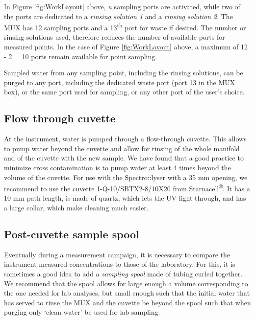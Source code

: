\documentclass[]{book}
\begin{document}
In Figure \ref{fig:WorkLayout} above, \emph{n} sampling ports are activated, while two of the ports are dedicated to a \emph{rinsing solution 1} and a \emph{rinsing solution 2}. The MUX has 12 sampling ports and a 13\textsuperscript{th} port for waste if desired. The number or rinsing solutions used, therefore reduces the number of available ports for measured points. In the case of Figure \ref{fig:WorkLayout} above, a maximum of 12 - 2 = 10 ports remain available for point sampling.

Sampled water from any sampling point, including the rinsing solutions, can be purged to any port, including the dedicated waste port (port 13 in the MUX box), or the same port used for sampling, or any other port of the user's choice.

\hypertarget{flow-through-cuvette}{%
\subsection{Flow through cuvette}\label{flow-through-cuvette}}

At the instrument, water is pumped through a flow-through cuvette. This allows to pump water beyond the cuvette and allow for rinsing of the whole manifold and of the cuvette with the new sample. We have found that a good practice to minimize cross contamination is to pump water at least 4 times beyond the volume of the cuvette. For use with the Spectro::lyser with a 35 mm opening, we recommend to use the cuvette 1-Q-10/SBTX2-8/10X20 from Starnacell\textsuperscript{®}. It has a 10 mm path length, is made of quartz, which lets the UV light through, and has a large collar, which make cleaning much easier.

\hypertarget{post-cuvette-sample-spool}{%
\subsection{Post-cuvette sample spool}\label{post-cuvette-sample-spool}}

Eventually during a measurement campaign, it is necessary to compare the instrument measured concentrations to those of the laboratory. For this, it is sometimes a good idea to add a \emph{sampling spool} made of tubing curled together. We recommend that the spool allows for large enough a volume corresponding to the one needed for lab analyses, but small enough such that the initial water that has served to rinse the MUX and the cuvette be beyond the spool such that when purging only `clean water' be used for lab sampling.
\end{document}

